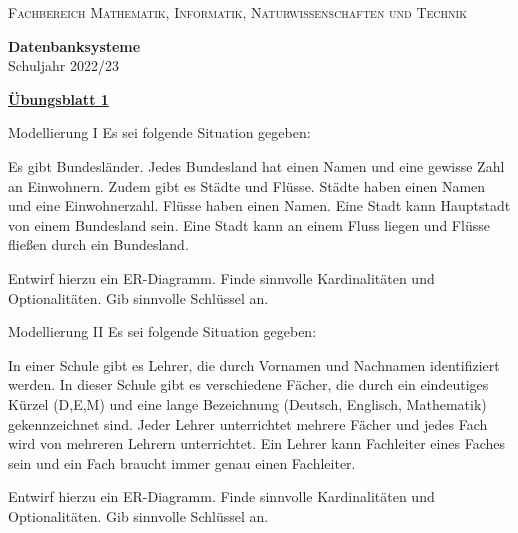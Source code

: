 \documentclass[12pt,a4paper,notitlepage,leqno]{article}
\begin{document}
\vspace{0.2cm}
\begin{minipage}[c]{0.5\textwidth}
\begin{center}
\textsc{Fachbereich Mathematik, Informatik, Naturwissenschaften und Technik}
\end{center}
\end{minipage}
\begin{minipage}[c]{0.5\textwidth}
\begin{center}
\textbf{Datenbanksysteme}\\
Schuljahr 2022/23
\end{center}
\end{minipage}

\begin{center}
\textbf{\underline{Übungsblatt 1}}

\vspace{0.2cm}
\end{center}

\begin{aufgabe}{Modellierung I}
Es sei folgende Situation gegeben:\medskip

\textsf{Es gibt Bundesländer. Jedes Bundesland hat einen Namen und eine gewisse Zahl an Einwohnern. Zudem gibt es Städte und Flüsse. Städte haben einen Namen und eine Einwohnerzahl. Flüsse haben einen Namen. Eine Stadt kann Hauptstadt von einem Bundesland sein. Eine Stadt kann an einem Fluss liegen und Flüsse fließen durch ein Bundesland.}\medskip

Entwirf hierzu ein ER-Diagramm. Finde sinnvolle Kardinalitäten und Optionalitäten. Gib sinnvolle Schlüssel an.

\end{aufgabe}

\begin{aufgabe}{Modellierung II}
Es sei folgende Situation gegeben:\medskip

\textsf{In einer Schule gibt es Lehrer, die durch Vornamen und Nachnamen identifiziert werden. In dieser Schule gibt es verschiedene Fächer, die durch ein eindeutiges Kürzel (D,E,M) und eine lange Bezeichnung (Deutsch, Englisch, Mathematik) gekennzeichnet sind. Jeder Lehrer unterrichtet mehrere Fächer und jedes Fach wird von mehreren Lehrern unterrichtet. Ein Lehrer kann Fachleiter eines Faches sein und ein Fach braucht immer genau einen Fachleiter.}\medskip

Entwirf hierzu ein ER-Diagramm. Finde sinnvolle Kardinalitäten und Optionalitäten. Gib sinnvolle Schlüssel an.

\end{aufgabe}
\end{document}
